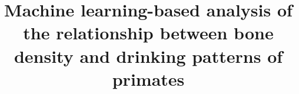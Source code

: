 \documentclass{bmcart}
\begin{document}
\begin{frontmatter}

\begin{fmbox}


\title{Machine learning-based analysis of the relationship between bone density and drinking patterns of primates}


\author[
   addressref={aff1},                   %
   corref={aff1},                       %
   email={Pablo.Rivas@Marist.edu}   %
]{ }
\author[
   addressref={aff2},
   email={urszula.iwaniec@oregonstate.edu}
]{ }
\author[
   addressref={aff3},
   email={grantka@ohsu.edu}
]{ }
\author[
   addressref={aff4},
   email={Erich\_Baker@Baylor.edu}
]{ }



\end{fmbox}
\end{frontmatter}
\end{document}
